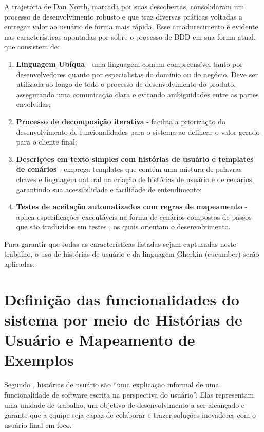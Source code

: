 A trajetória de Dan North, marcada por suas descobertas, consolidaram um processo de desenvolvimento robusto e que traz diversas práticas voltadas a entregar valor 
ao usuário de forma mais rápida. Esse amadurecimento é evidente nas características apontadas por \cite{studyBDD} sobre o processo de BDD em sua forma atual, que consistem de:

\begin{enumerate}
	\item \textbf{Linguagem Ubíqua} - uma linguagem comum compreensível tanto por desenvolvedores quanto por especialistas do domínio ou do negócio. Deve ser utilizada 
	ao longo de todo o processo de desenvolvimento do produto, assegurando uma comunicação clara e evitando ambiguidades entre as partes envolvidas;
	\item \textbf{Processo de decomposição iterativa} - facilita a priorização do desenvolvimento de funcionalidades para o sistema ao delinear o valor gerado para o cliente final;
	\item \textbf{Descrições em texto simples com histórias de usuário e templates de cenários} - emprega templates que contém uma mistura de palavras chaves e linguagem natural na 
	criação de histórias de usuário e de cenários, garantindo sua acessibilidade e facilidade de entendimento;
	\item \textbf{Testes de aceitação automatizados com regras de mapeamento} - aplica especificações executáveis na forma de cenários compostos de passos que são traduzidos em testes
	, os quais orientam o desenvolvimento.
\end{enumerate}

Para garantir que todas as características listadas sejam capturadas neste trabalho, o uso de histórias de usuário \cite{atlassianUserStories} e da 
linguagem Gherkin (cucumber) \cite{cucumberHistory} serão aplicadas.


\section{Definição das funcionalidades do sistema por meio de Histórias de Usuário e Mapeamento de Exemplos}

Segundo \cite{atlassianUserStories}, histórias de usuário são “uma explicação informal de uma funcionalidade de software escrita na perspectiva do usuário”. Elas 
representam uma unidade de trabalho, um objetivo de desenvolvimento a ser alcançado e garante que a equipe seja capaz de colaborar e trazer soluções inovadores 
com o usuário final em foco.

